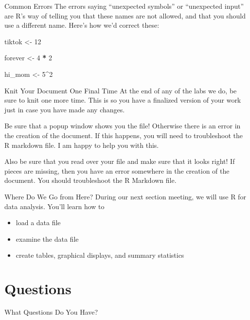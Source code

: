 \documentclass[
  ignorenonframetext,
]{beamer}
\newenvironment{Shaded}{\begin{snugshade}}{\end{snugshade}}
\newcommand{\DecValTok}[1]{\textcolor[rgb]{0.00,0.00,0.81}{#1}}
\newcommand{\NormalTok}[1]{#1}
\newcommand{\OtherTok}[1]{\textcolor[rgb]{0.56,0.35,0.01}{#1}}
\newcommand{\SpecialCharTok}[1]{\textcolor[rgb]{0.81,0.36,0.00}{\textbf{#1}}}
\providecommand{\tightlist}{%
  \setlength{\itemsep}{0pt}\setlength{\parskip}{0pt}}
\begin{document}
\begin{frame}[fragile]{Common Errors}
\label{common-errors-1}
The errors saying ``unexpected symbols'' or ``unexpected input'' are R's
way of telling you that these names are not allowed, and that you should
use a different name. Here's how we'd correct these:

\begin{Shaded}
\begin{Highlighting}[]
\NormalTok{tiktok }\OtherTok{\textless{}{-}} \DecValTok{12}

\NormalTok{forever }\OtherTok{\textless{}{-}} \DecValTok{4} \SpecialCharTok{*} \DecValTok{2}

\NormalTok{hi\_mom }\OtherTok{\textless{}{-}} \DecValTok{5}\SpecialCharTok{\^{}}\DecValTok{2}
\end{Highlighting}
\end{Shaded}
\end{frame}

\begin{frame}{Knit Your Document One Final Time}
\label{knit-your-document-one-final-time}
At the end of any of the labs we do, be sure to knit one more time. This
is so you have a finalized version of your work just in case you have
made any changes.

Be sure that a popup window shows you the file! Otherwise there is an
error in the creation of the document. If this happens, you will need to
troubleshoot the R markdown file. I am happy to help you with this.

Also be sure that you read over your file and make sure that it looks
right! If pieces are missing, then you have an error somewhere in the
creation of the document. You should troubleshoot the R Markdown file.
\end{frame}

\begin{frame}{Where Do We Go from Here?}
\label{where-do-we-go-from-here}
During our next section meeting, we will use R for data analysis. You'll
learn how to

\begin{itemize}
\tightlist
\item
  load a data file
\item
  examine the data file
\item
  create tables, graphical displays, and summary statistics
\end{itemize}
\end{frame}

\section{Questions}\label{questions}

\begin{frame}{What Questions Do You Have?}
\label{what-questions-do-you-have}
\end{frame}
\end{document}
